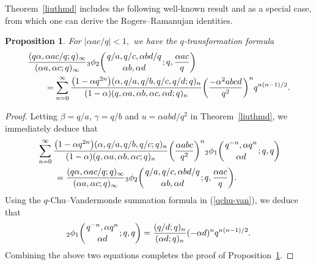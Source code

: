 \documentclass[pdftex]{sigma}
\numberwithin{equation}{section}
\newtheorem{Proposition}[Theorem]{Proposition}
 { \theoremstyle{definition}
\newtheorem{Definition}[Theorem]{Definition}
\newtheorem{Note}[Theorem]{Note}
\newtheorem{Example}[Theorem]{Example}
\newtheorem{Remark}[Theorem]{Remark} }
\begin{document}
Theorem~\ref{liuthmd} includes the following well-known result \cite[equation~(3.8.9)]{Gas+Rah} and \cite[Theorem~1.8]{Liu2013IJTN} as a special case, from which one can derive the Rogers--Ramanujan identities.
\begin{Proposition}\label{WRR} For $|\alpha ac/q|<1,$ we have the $q$-transformation formula
	\begin{align*}
		&\frac{(q\alpha, \alpha ac/q; q )_\infty}{(\alpha a, \alpha c; q )_\infty} {_3\phi_2} \biggl({{q/a, q/c, \alpha bd/q}\atop{\alpha b, \alpha d}}; q, \frac{\alpha ac}{q}\biggr)\\
		&\qquad{}=\sum_{n=0}^\infty \frac{\bigl(1-\alpha q^{2n}\bigr)(\alpha, q/a, q/b, q/c, q/d; q)_n}{(1-\alpha)(q, \alpha a, \alpha b, \alpha c, \alpha d; q)_n}\biggl(\frac{-\alpha^2 abcd}{q^2}\biggr)^n q^{n(n-1)/2}.
	\end{align*}	
\end{Proposition}
\begin{proof}
	Letting $\beta=q/a$, $\gamma=q/b$ and $u=\alpha abd/{q^2}$ in Theorem~\ref{liuthmd}, we immediately deduce that
	\begin{align*}
		&\sum_{n=0}^\infty \frac{\bigl(1-\alpha q^{2n}\bigr)(\alpha, q/a, q/b, q/c; q)_n}{(1-\alpha)(q, \alpha a, \alpha b, \alpha c; q)_n}\biggl(\frac{\alpha abc}{q^2}\biggr)^n {_2\phi_1}\biggl({{q^{-n}, \alpha q^n}
			\atop{\alpha d}}; q, q\biggr)\\
		&\qquad{}=\frac{(q\alpha, \alpha ac/q; q )_\infty}{(\alpha a, \alpha c; q )_\infty} {_3\phi_2} \biggl({{q/a, q/c, \alpha bd/q}\atop{\alpha b, \alpha d}}; q, \frac{\alpha ac}{q}\biggr).
	\end{align*}
	Using the $q$-Chu--Vandermonde summation formula in (\ref{qchu-van}), we deduce that
	\[
	{_2\phi_1}\biggl({{q^{-n}, \alpha q^n}
		\atop{\alpha d}}; q, q\biggr)=\frac{(q/d; q)_n}{(\alpha d; q)_n}
	(-\alpha d)^n q^{n(n-1)/2}.
	\]
	Combining the above two equations completes the proof of Proposition~\ref{WRR}.
\end{proof}
\end{document}
